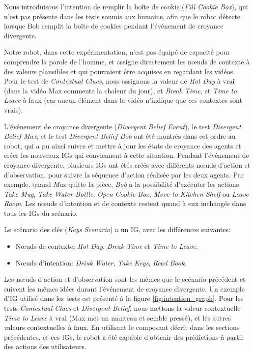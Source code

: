 \documentclass[a4paper,11pt,twoside]{StyleThese}
\begin{document}
Nous introduisons l'intention de remplir la boîte de cookie (\textit{Fill Cookie Box}), qui n'est pas présente dans les tests soumis aux humains, afin que le robot détecte lorsque Bob remplit la boîte de cookies pendant l'événement de croyance divergente.

Notre robot, dans cette expérimentation, n'est pas équipé de capacité pour comprendre la parole de l'homme, et assigne directement les nœuds de contexte à des valeurs plausibles et qui pourraient être acquises en regardant les vidéos. Pour le test de \textit{Contextual Clues}, nous assignons la valeur de \textit{Hot Day} à vrai (dans la vidéo Max commente la chaleur du jour), et \textit{Break Time}, et \textit{Time to Leave} à faux (car aucun élément dans la vidéo n'indique que ces contextes sont vrais).


L'événement de croyance divergente (\textit{Divergent Belief Event}), le test \textit{Divergent Belief Max}, et le test \textit{Divergent Belief Bob} ont été montrés dans cet ordre au robot, qui a pu ainsi suivre et mettre à jour les états de croyance des agents et créer les nouveaux IGs qui conviennent à cette situation. Pendant l'événement de croyance divergente, plusieurs IGs ont étés créés avec différents nœuds d'action et d'observation, pour suivre la séquence d'action réalisée par les deux agents. Par exemple, quand \textit{Max} quitte la pièce, \textit{Bob} a la possibilité d'exécuter les actions \textit{Take Mug}, \textit{Take Water Bottle}, \textit{Open Cookie Box}, \textit{Move to Kitchen Shelf} ou \textit{Leave Room}. Les nœuds d'intention et de contexte restent quand à eux inchangés dans tous les IGs du scénario.


Le scénario des clés (\textit{Keys Scenario}) a un IG, avec les différences suivantes:
\begin{itemize}
\item Nœuds de contexte: \textit{Hot Day}, \textit{Break Time} et \textit{Time to Leave}.
\item Nœuds d'intention: \textit{Drink Water}, \textit{Take Keys}, \textit{Read Book}.
\end{itemize}

Les nœuds d'action et d'observation sont les mêmes que le scénario précédent et suivent les mêmes idées durant l'événement de croyance divergente. Un exemple d'IG utilisé dans les tests est présenté à la figure \ref{fig:intention_graph}. Pour les tests \textit{Contextual Clues} et \textit{Divergent Belief}, nous mettons la valeur contextuelle \textit{Time to Leave} à vrai (Max met un manteau et semble pressé), et les autres valeurs contextuelles à faux. En utilisant le composant décrit dans les sections précédentes, et ces IGs, le robot a été capable d'obtenir des prédictions à partir des actions des utilisateurs.
\end{document}
